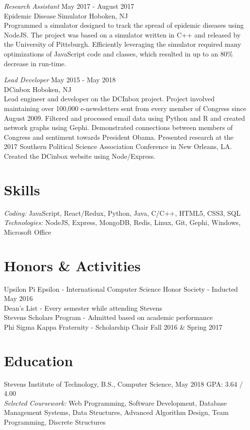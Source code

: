 \documentclass{res}
\begin{document}
{{\sl Research Assistant} \hfill May 2017 - August 2017\\
Epidemic Disease Simulator \hfill Hoboken, NJ \\
Programmed a simulator designed to track the spread of epidemic diseases using NodeJS. The project was based on a simulator written in C++ and released by the University of Pittsburgh. Efficiently leveraging the simulator required many optimizations of JavaScript code and classes, which resulted in up to an 80\% decrease in run-time.

{\sl Lead Developer} \hfill May 2015 - May 2018 \\
DCinbox \hfill Hoboken, NJ \\
Lead engineer and developer on the DCInbox project. Project involved maintaining over 100,000 e-newsletters sent from every member of Congress since August 2009. Filtered and processed email data using Python and R and created network graphs using Gephi. Demonstrated connections between members of Congress and sentiment towards President Obama. Presented research at the 2017 Southern Political Science Association Conference in New Orleans, LA. Created the DCinbox website using Node/Express.


\section{\bf\large Skills}
{\sl Coding: } JavaScript, React/Redux, Python, Java, C/C++, HTML5, CSS3, SQL \\
{\sl Technologies:} NodeJS, Express, MongoDB, Redis, Linux, Git, Gephi, Windows, Microsoft Office

\section{\bf\large Honors \& Activities}
Upsilon Pi Epsilon - International Computer Science Honor Society - Inducted May 2016\\
Dean's List - Every semester while attending Stevens \\
Stevens Scholars Program - Admitted based on academic performance \\ %
Phi Sigma Kappa Fraternity - Scholarship Chair Fall 2016 \& Spring 2017

\section{\bf\large Education}
Stevens Institute of Technology, B.S., Computer Science, May 2018 \hfill GPA: 3.64 / 4.00 \\
{\sl Selected Coursework:} Web Programming, Software Development, Database Management Systems, Data Structures, Advanced Algorithm Design, Team Programming, Discrete Structures

}
\end{document}
